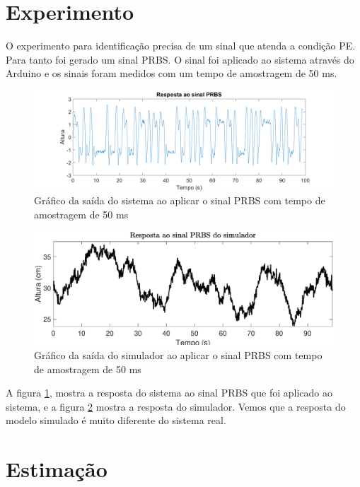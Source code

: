 \section{Experimento}\label{s:4experimento}
O experimento para identificação precisa de um sinal que atenda a condição PE. Para tanto foi gerado um sinal PRBS. O sinal foi aplicado ao sistema através do Arduino e os sinais foram medidos com um tempo de amostragem de 50 ms.
\begin{figure}[htb]
	\centering
	\includegraphics[width=1\linewidth]{sinalprbsid}
	\caption[Gráfico da saída PRBS do sistema]{Gráfico da saída do sistema ao aplicar o sinal PRBS com tempo de amostragem de 50 ms}
	\label{fig:sinalprbsid}
\end{figure}

\begin{figure}[htb]
	\centering
	\includegraphics[width=1\linewidth]{sinalprbsidsimul}
	\caption[Gráfico da saída PRBS do simulador]{Gráfico da saída do simulador ao aplicar o sinal PRBS com tempo de amostragem de 50 ms}
	\label{fig:sinalprbsidsimul}
\end{figure}


A figura \ref{fig:sinalprbsid}, mostra a resposta do sistema ao sinal PRBS que foi aplicado ao sistema, e a figura \ref{fig:sinalprbsidsimul} mostra a resposta do simulador. Vemos que a resposta do modelo simulado é muito diferente do sistema real.

\section{Estimação}\label{s:4estimacao}

